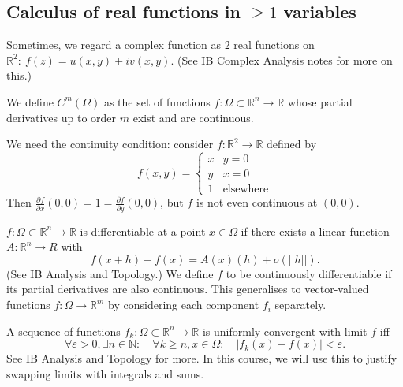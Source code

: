 \documentclass[a4paper]{scrartcl}
\begin{document}
\subsection{Calculus of real functions in $\geq 1$ variables}
Sometimes, we regard a complex function as 2 real functions on $\mathbb{R}^{2} : \ f (z)=u (x,y)+iv (x,y)$. (See IB Complex Analysis notes for more on this.)

\begin{definition}
     We define $C^{m}(\Omega)$ as the set of functions $f: \Omega \subset \mathbb{R}^{n} \rightarrow \mathbb{R}$ whose partial derivatives up to order $m$ exist and are continuous. 
\end{definition}
\begin{remark}
     We need the continuity condition: consider $f: \mathbb{R}^{2} \rightarrow \mathbb{R}$ defined by
     \begin{equation*}
        f (x,y)=
          \begin{cases}
              x & y=0\\
              y & x=0 \\
              1 & \text{elsewhere}
          \end{cases}      
     \end{equation*}
    Then $\frac{\partial f}{\partial x}(0,0)=1=\frac{\partial f}{\partial y}(0,0)$, but $f$ is not even continuous at $(0,0)$. 
\end{remark}

\begin{definition}
     $f: \Omega \subset \mathbb{R}^{n} \rightarrow \mathbb{R}$ is differentiable at a point $x \in \Omega$ if there exists a linear function $A: \mathbb{R}^{n} \rightarrow R$ with \[
     f (x+h)-f (x)=A (x)(h) +o (||h||)
     .\] (See IB Analysis and Topology.) We define $f$ to be continuously differentiable if its partial derivatives are also continuous. This generalises to vector-valued functions $f: \Omega \rightarrow \mathbb{R}^{m}$ by considering each component $f_{i}$ separately.  
\end{definition}

\begin{definition}
     A sequence of functions $f_{k}: \Omega \subset \mathbb{R}^{n} \rightarrow \mathbb{R}$ is uniformly convergent with limit $f$ iff \[
     \forall \varepsilon>0, \exists n \in \mathbb{N}: \quad  \forall k \geq n, x \in \Omega: \quad |f_{k} (x)- f (x)|< \varepsilon
     .\]
     See IB Analysis and Topology for more. In this course, we will use this to justify swapping limits with integrals and sums. 
\end{definition}
\end{document}
